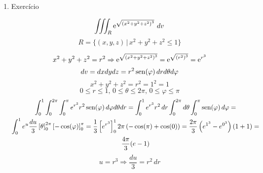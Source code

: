 \begin{enumerate}
	\item Exercício
	
	\begin{equation*}
		\iiint_R \operatorname{e}^{\sqrt{\left(x^2 + y^2 + z^2\right)^3}}\, dv
	\end{equation*}
	\begin{equation*}
		R = \{(x,y,z) \,|\, x^2 + y^2 + z^2 \leq 1\}
	\end{equation*}
	
	\begin{equation*}
		x^2 + y^2 + z^2 = r^2 \Rightarrow \operatorname{e}^{\sqrt{\left(x^2 + y^2 + z^2\right)^3}} = \operatorname{e}^{\sqrt{\left(r^2\right)^3}} = \operatorname{e}^{r^3}
	\end{equation*}
	\begin{equation*}
		dv = dxdydz = r^2\operatorname{sen}(\varphi)\, dr d\theta d\varphi
	\end{equation*}
	\begin{equation*}
		x^2 + y^2 + z^2 = r^2 = 1^2 = 1
	\end{equation*}
	\begin{equation*}
		0 \leq r \leq 1,\, 0 \leq \theta \leq 2\pi,\, 0 \leq \varphi \leq \pi
	\end{equation*}
	\begin{gather*}
		\int_0^1 \int_0^{2\pi} \int_0^{\pi} e^{r^3} r^2\operatorname{sen}(\varphi)\, d\varphi d\theta dr = \int_0^1 e^{r^3} r^2\,dr \int_0^{2\pi} d\theta \int_0^{\pi} \operatorname{sen}(\varphi)\, d\varphi =\\ \int_0^1 e^u \dfrac{du}{3} \left[\theta\right]_0^{2\pi} \left[-\cos(\varphi)\right]_0^{\pi} = \dfrac{1}{3} \left[e^{r^3}\right]_0^1 2\pi \left(-\cos(\pi) + \cos(0)\right) = \dfrac{2\pi}{3} \left(e^{1^3} - e^{0^3}\right)(1+1) =\\ \dfrac{4\pi}{3} (e - 1)
	\end{gather*}
	\begin{equation*}
		u = r^3 \Rightarrow \dfrac{du}{3} = r^2\, dr
	\end{equation*}
\end{enumerate}